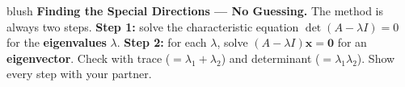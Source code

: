 \documentclass[10pt]{article}
\newcommand{\xx}{\mathbf{x}}
\newcommand{\zero}{\mathbf{0}}
\begin{document}
\namepartnerperiod

\vspace{0.10in}

\begin{headlinebox}{blush}
\small\textbf{Finding the Special Directions --- No Guessing.} The method is always two steps.
\textbf{Step 1:} solve the characteristic equation $\det(A-\lambda I)=0$ for the \textbf{eigenvalues}
$\lambda$. \textbf{Step 2:} for each $\lambda$, solve $(A-\lambda I)\xx=\zero$ for an
\textbf{eigenvector}. Check with trace ($=\lambda_1+\lambda_2$) and determinant ($=\lambda_1\lambda_2$).
Show every step with your partner.
\end{headlinebox}

\vspace{0.08in}
\end{document}

